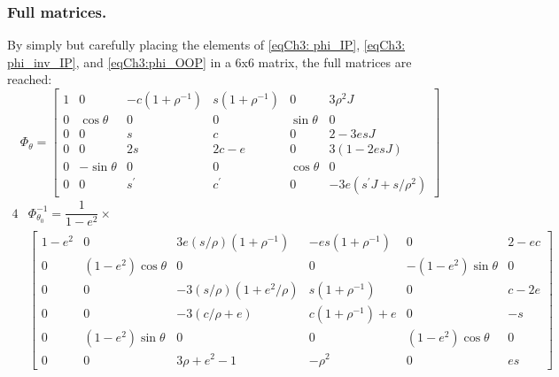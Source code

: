 		\subsubsection{Full matrices.}
		\indent By simply but carefully placing the elements of \eqref{eqCh3: phi_IP}, \eqref{eqCh3: phi_inv_IP}, and \eqref{eqCh3:phi_OOP} in a 6x6 matrix, the full matrices are reached:
		\begin{equation}
		\label{eqCh3:phi_final} \Phi_{\theta} = 
		\left[
		\begin{array}{cccccc}
		1 	&    0 			&  -c  (1 + \rho^{-1})	& s  (1 + \rho^{-1})	&    0			&                  3 \rho^2 J \\
        0	&  \cos\theta 	&                   0	&                 0	&  \sin\theta 	&                              0\\
        0 	&  	0			&                  s	&                 c	&    0			&              2 - 3  e  s  J\\
        0	&    0			&              2  s		&         2  c - e	&    0			&       3  (1  - 2 e  s  J)\\
        0	& -\sin\theta   &                0 		&                 0&  \cos\theta 	&                              0\\
        0	&	0 			&             s^{\prime}	&            c^{\prime}&    0			& -3  e  (s^{\prime}  J + s/\rho^2)
		\end{array}
		\right]
		\end{equation}
		\begin{alignat}{4}
		&\nonumber \Phi_{\theta_0}^{-1} = \dfrac{1}{1 - e^2}\times \\ 
		&\label{eqCh3:phi_inv_final}\left[
		\begin{array}{cccccc}
		1 - e^2	&    0 					&  3 e  (s/\rho)  (1 + \rho^{-1})		& -e s  (1 + \rho^{-1})	&    0						&                 2 - e c\\
        0		&  (1 - e^2) \cos\theta	&         0							&                 0		&  -(1 - e^2) \sin\theta 	&              0\\
        0 		&  	0					&     -3  (s/\rho)  (1 + e^2/\rho)	&   s  (1 + \rho^{-1})	&    0						&              c - 2e	\\
        0		&    0					&          -3  (c/\rho + e)			&  c  (1 + \rho^{-1}) + e	&    0						&      -s 		\\
        0		& (1 - e^2) \sin\theta 	&                0 					&                 0		&  (1 - e^2) \cos\theta 	&                              0\\
        0		&	0 					&             3  \rho + e^2 - 1		&           -\rho^2 	&    0						& e s
		\end{array}
		\right]
		\end{alignat}
